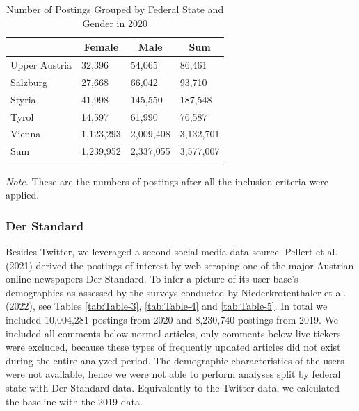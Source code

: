 \documentclass[
  english,
  jou,floatsintext]{apa7}
\begin{document}
\begin{table}[tbp]

\begin{center}
\begin{threeparttable}

\caption{\label{tab:Table-6}Number of Postings Grouped by Federal State and Gender in 2020}

\small{

\begin{tabular}{m{1.65cm}m{1.65cm}m{1.65cm}m{1.65cm}}
\toprule
 & \multicolumn{1}{c}{Female} & \multicolumn{1}{c}{Male} & \multicolumn{1}{c}{Sum}\\
\midrule
Upper Austria & 32,396 & 54,065 & 86,461\\
Salzburg & 27,668 & 66,042 & 93,710\\
Styria & 41,998 & 145,550 & 187,548\\
Tyrol & 14,597 & 61,990 & 76,587\\
Vienna & 1,123,293 & 2,009,408 & 3,132,701\\
Sum & 1,239,952 & 2,337,055 & 3,577,007\\
\bottomrule
\addlinespace
\end{tabular}

}

\begin{tablenotes}[para]
\normalsize{\textit{Note.} These are the numbers of postings after all the inclusion criteria were applied.}
\end{tablenotes}

\end{threeparttable}
\end{center}

\end{table}

\hypertarget{der-standard}{%
\subsubsection{Der Standard}\label{der-standard}}

Besides Twitter, we leveraged a second social media data source. Pellert et al. (2021) derived the postings of interest by web scraping one of the major Austrian online newspapers Der Standard. To infer a picture of its user base's demographics as assessed by the surveys conducted by Niederkrotenthaler et al. (2022), see Tables \ref{tab:Table-3}, \ref{tab:Table-4} and \ref{tab:Table-5}. In total we included 10,004,281 postings from 2020 and 8,230,740 postings from 2019. We included all comments below normal articles, only comments below live tickers were excluded, because these types of frequently updated articles did not exist during the entire analyzed period. The demographic characteristics of the users were not available, hence we were not able to perform analyses split by federal state with Der Standard data. Equivalently to the Twitter data, we calculated the baseline with the 2019 data.
\end{document}
